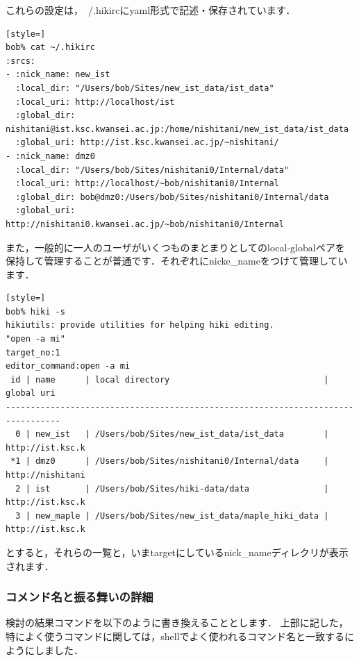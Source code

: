 これらの設定は，~/.hikircにyaml形式で記述・保存されています．
\begin{lstlisting}[style=]
bob% cat ~/.hikirc
:srcs:
- :nick_name: new_ist
  :local_dir: "/Users/bob/Sites/new_ist_data/ist_data"
  :local_uri: http://localhost/ist
  :global_dir: nishitani@ist.ksc.kwansei.ac.jp:/home/nishitani/new_ist_data/ist_data
  :global_uri: http://ist.ksc.kwansei.ac.jp/~nishitani/
- :nick_name: dmz0
  :local_dir: "/Users/bob/Sites/nishitani0/Internal/data"
  :local_uri: http://localhost/~bob/nishitani0/Internal
  :global_dir: bob@dmz0:/Users/bob/Sites/nishitani0/Internal/data
  :global_uri: http://nishitani0.kwansei.ac.jp/~bob/nishitani0/Internal
\end{lstlisting}
また，一般的に一人のユーザがいくつものまとまりとしてのlocal-globalペアを
保持して管理することが普通です．それぞれにnicke\_nameをつけて管理しています．
\begin{lstlisting}[style=]
bob% hiki -s
hikiutils: provide utilities for helping hiki editing.
"open -a mi"
target_no:1
editor_command:open -a mi
 id | name      | local directory                               | global uri     
---------------------------------------------------------------------------------
  0 | new_ist   | /Users/bob/Sites/new_ist_data/ist_data        | http://ist.ksc.k
 *1 | dmz0      | /Users/bob/Sites/nishitani0/Internal/data     | http://nishitani
  2 | ist       | /Users/bob/Sites/hiki-data/data               | http://ist.ksc.k
  3 | new_maple | /Users/bob/Sites/new_ist_data/maple_hiki_data | http://ist.ksc.k
\end{lstlisting}
とすると，それらの一覧と，いまtargetにしているnick\_nameディレクリが表示されます．

\subsubsection{コメンド名と振る舞いの詳細}
検討の結果コマンドを以下のように書き換えることとします．
上部に記した，特によく使うコマンドに関しては，shellでよく使われるコマンド名と一致するにようにしました．

